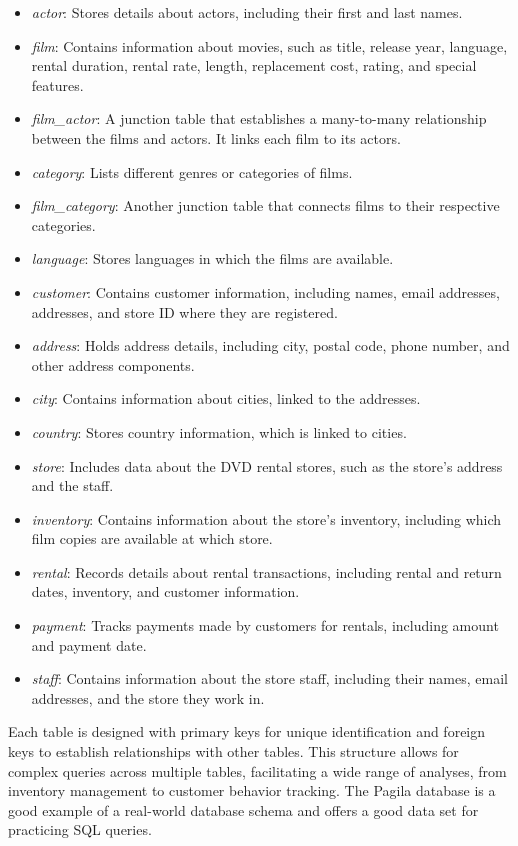 \begin{itemize}
  \item \emph{actor}: Stores details about actors, including their first and last names.
  \item \emph{film}: Contains information about movies, such as title, release year, language, rental duration, rental rate, length, replacement cost, rating, and special features.
  \item \emph{film\_actor}: A junction table that establishes a many-to-many relationship between the films and actors. It links each film to its actors.
  \item \emph{category}: Lists different genres or categories of films.
  \item \emph{film\_category}: Another junction table that connects films to their respective categories.
  \item \emph{language}: Stores languages in which the films are available.
  \item \emph{customer}: Contains customer information, including names, email addresses, addresses, and store ID where they are registered.
  \item \emph{address}: Holds address details, including city, postal code, phone number, and other address components.
  \item \emph{city}: Contains information about cities, linked to the addresses.
  \item \emph{country}: Stores country information, which is linked to cities.
  \item \emph{store}: Includes data about the DVD rental stores, such as the store's address and the staff.
  \item \emph{inventory}: Contains information about the store's inventory, including which film copies are available at which store.
  \item \emph{rental}: Records details about rental transactions, including rental and return dates, inventory, and customer information.
  \item \emph{payment}: Tracks payments made by customers for rentals, including amount and payment date.
  \item \emph{staff}: Contains information about the store staff, including their names, email addresses, and the store they work in.
\end{itemize}

Each table is designed with primary keys for unique identification and foreign keys to establish relationships with other tables. This structure allows for complex queries across multiple tables, facilitating a wide range of analyses, from inventory management to customer behavior tracking. The Pagila database is a good example of a real-world database schema and offers a good data set for practicing SQL queries.

